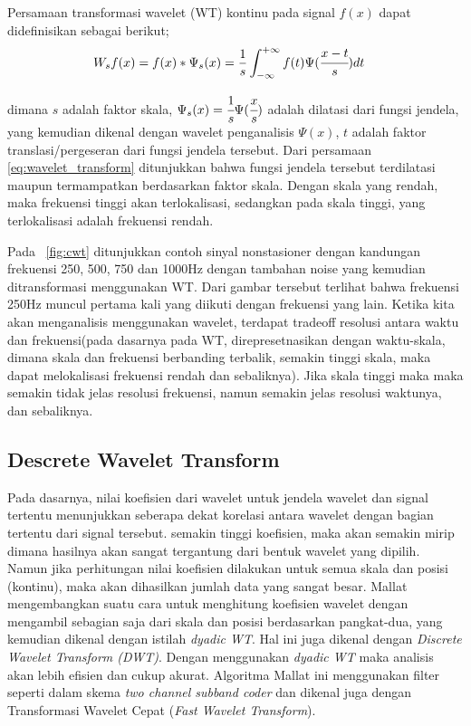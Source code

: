 Persamaan transformasi wavelet (WT) kontinu pada signal $f(x)$ dapat
didefinisikan sebagai berikut;
\begin{align}
\label{eq:wavelet_transform}
	W_{s}f(x) &= f(x) * \Psi_{s}(x) = \frac{1}{s}\int^{+\infty}_{-\infty}f(t)\Psi(\cfrac{x - t}{s})dt
\end{align}

\noindent dimana $s$ adalah faktor skala,  $\Psi_{s}(x) =
\cfrac{1}{s}\Psi(\cfrac{x}{s})$ adalah dilatasi dari fungsi jendela, yang
kemudian dikenal dengan wavelet penganalisis $\Psi(x)$, $t$ adalah  faktor
translasi/pergeseran dari fungsi jendela tersebut. Dari persamaan
\ref{eq:wavelet_transform} ditunjukkan bahwa fungsi jendela tersebut terdilatasi
maupun termampatkan berdasarkan faktor skala. Dengan skala yang rendah, maka
frekuensi tinggi akan terlokalisasi, sedangkan pada skala tinggi, yang
terlokalisasi adalah frekuensi rendah. 


Pada \pic~\ref{fig:cwt} ditunjukkan contoh sinyal nonstasioner dengan kandungan
frekuensi 250, 500, 750 dan 1000Hz dengan tambahan noise yang kemudian
ditransformasi menggunakan WT. Dari gambar tersebut terlihat bahwa frekuensi
250Hz muncul pertama kali yang diikuti dengan frekuensi yang lain. Ketika kita
akan menganalisis menggunakan wavelet, terdapat tradeoff resolusi antara waktu
dan frekuensi(pada dasarnya pada WT, direpresetnasikan dengan waktu-skala,
dimana skala dan frekuensi berbanding terbalik, semakin tinggi skala, maka
dapat melokalisasi frekuensi rendah dan sebaliknya). Jika skala tinggi
maka maka semakin tidak jelas resolusi frekuensi, namun
semakin jelas resolusi waktunya, dan sebaliknya.

\subsection{Descrete Wavelet Transform}
Pada dasarnya, nilai koefisien dari wavelet untuk jendela wavelet dan
signal tertentu menunjukkan seberapa dekat korelasi antara wavelet 
dengan bagian tertentu dari signal tersebut. semakin tinggi koefisien, maka akan
semakin mirip dimana hasilnya akan sangat tergantung dari bentuk wavelet yang
dipilih\cite{wavelet:matlab}. Namun jika perhitungan nilai koefisien dilakukan
untuk semua skala dan posisi (kontinu), maka akan dihasilkan jumlah data yang
sangat besar. Mallat \cite{Mallat:1989} mengembangkan suatu cara untuk
menghitung koefisien wavelet dengan mengambil sebagian saja dari skala dan
posisi berdasarkan pangkat-dua, yang kemudian dikenal dengan istilah
\emph{dyadic WT}. Hal ini juga dikenal dengan \emph{Discrete Wavelet
Transform (DWT)}. Dengan menggunakan \emph{dyadic WT} maka analisis akan lebih
efisien dan cukup  akurat. Algoritma Mallat ini menggunakan filter seperti dalam
skema \emph{two channel subband coder} dan dikenal juga dengan Transformasi
Wavelet Cepat (\emph{Fast Wavelet Transform}).

